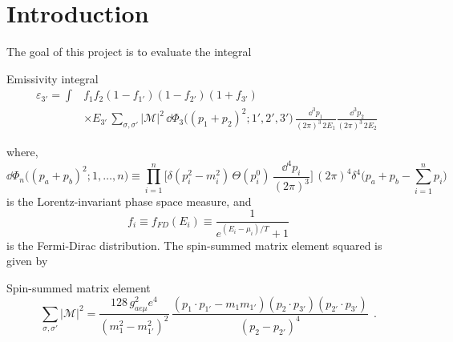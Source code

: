 \section{Introduction}
\label{sec:introduction}
The goal of this project is to evaluate the integral 

\begin{bluenv}{Emissivity integral}
    \begin{equation}
    \label{eq:emissivity-integral}
    \begin{aligned}
        \varepsilon_{3'} = \int 
            & f_1 f_2 (1 - f_{1'}) (1 - f_{2'}) (1 + f_{3'}) \\
            &\times E_{3'} \,
            \sum_{\sigma, \sigma'} | \mathcal{M} |^2 \,
            \dd \Phi_3 \big( (p_1 + p_2)^2; 1', 2', 3'\big)
            \,
            \frac{\dd^3 p_1}{(2\pi)^3\, 2 E_1}
            \frac{\dd^3 p_2}{(2\pi)^3\, 2 E_2} 
            \; 
    \end{aligned}
    \end{equation}
\end{bluenv}
where, 
\begin{equation}
    \label{eq:LIPS}
    \dd \Phi_n \big((p_a + p_b)^2; 1, \ldots, n \big) \equiv 
    \prod_{i=1}^{n}
    \bigg[
         \delta (p_i^2 - m_i^2) \, \Theta(p_i^0) \, 
        \frac{\dd^4 p_i}{(2\pi)^3}
    \bigg] \, (2\pi)^4 \delta^4 
    \bigg( 
        p_a + p_b - \sum_{i=1}^{n} p_i
    \bigg) \quad 
\end{equation}
is the Lorentz-invariant phase space measure, and
\begin{equation*}
    f_i \equiv f_{FD}(E_i) \equiv \frac{1}{e^{(E_i - \mu_i)/T} + 1}
\end{equation*}
is the Fermi-Dirac distribution. 
The spin-summed matrix element squared is given by
\begin{bluenv}{Spin-summed matrix element}
    \begin{equation}
        \label{eq:matrix-element}
        \sum_{\sigma, \sigma'} | \mathcal{M} |^2 
            = 
            \frac{128 \, g^2_{ae\mu} e^4}{(m_1^2 - m_{1'}^2)^2} \,
            \frac{
                 (p_1 \cdot p_{1'} - m_1 m_{1'})
                (p_2 \cdot p_{3'})
                (p_{2'} \cdot p_{3'})
            }
            {
                (p_2 - p_{2'})^4
            } \; \, .
    \end{equation}
\end{bluenv}


